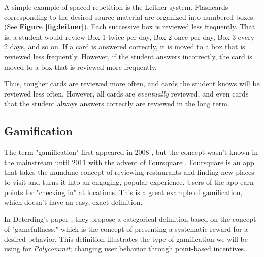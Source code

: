 \par A simple example of spaced repetition is the Leitner system. Flashcards corresponding to the desired source material are organized into numbered boxes. (See \textbf{\hyperref[fig:leitner]{Figure \ref*{fig:leitner}}}). Each successive box is reviewed less frequently. That is, a student would review Box 1 twice per day, Box 2 once per day, Box 3 every 2 days, and so on. If a card is answered correctly, it is moved to a box that is reviewed less frequently. However, if the student answers incorrectly, the card is moved to a box that is reviewed more frequently.

\par Thus, tougher cards are reviewed more often, and cards the student knows will be reviewed less often. However, all cards are \textit{eventually} reviewed, and even cards that the student always answers correctly are reviewed in the long term.

\subsection{Gamification}
\par The term "gamification" first appeared in 2008 , but the concept wasn't known in the mainstream until 2011 with the advent of Foursquare \cite{Deterding:2011:GDE:2181037.2181040}. Foursquare is an app that takes the mundane concept of reviewing restaurants and finding new places to visit and turns it into an engaging, popular experience. Users of the app earn points for "checking in" at locations. This is a great example of gamification, which doesn't have an easy, exact definition. 

\par In Deterding's paper \cite{Deterding:2011:GDE:2181037.2181040}, they propose a categorical definition based on the concept of "gamefullness," which is the concept of presenting a systematic reward for a desired behavior. This definition illustrates the type of gamification we will be using for \textit{Polycommit}; changing user behavior through point-based incentives.



